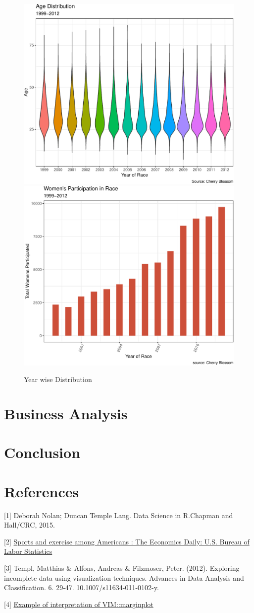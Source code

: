 \documentclass[
]{article}
\begin{document}
\begin{figure}[H]

\includegraphics[width=.49\linewidth,]{case_study02_files/figure-latex/unnamed-chunk-12-1} \includegraphics[width=.49\linewidth,]{case_study02_files/figure-latex/unnamed-chunk-12-2} \hfill{}

\caption{Year wise Distribution}\label{fig:unnamed-chunk-12}
\end{figure}

\newpage

\hypertarget{business-analysis}{%
\section{Business Analysis}\label{business-analysis}}

\newpage

\hypertarget{conclusion}{%
\section{Conclusion}\label{conclusion}}

\hypertarget{references}{%
\section*{References}\label{references}}

{[}1{]} Deborah Nolan; Duncan Temple Lang. Data Science in R.Chapman and
Hall/CRC, 2015.

{[}2{]}
\href{https://www.bls.gov/opub/ted/2016/sports-and-exercise-among-americans.htm}{Sports
and exercise among Americans : The Economics Daily: U.S. Bureau of Labor
Statistics}

{[}3{]} Templ, Matthias \& Alfons, Andreas \& Filzmoser, Peter. (2012).
Exploring incomplete data using visualization techniques. Advances in
Data Analysis and Classification. 6. 29-47. 10.1007/s11634-011-0102-y.

{[}4{]}
\href{https://boostedml.com/2020/05/visualizing-missing-data-in-r-the-basics-with-vim.html\#The_Margin_Plot_Checking_Missing_Completely_at_Random_MCAR}{Example
of interpretation of VIM::marginplot}
\end{document}
